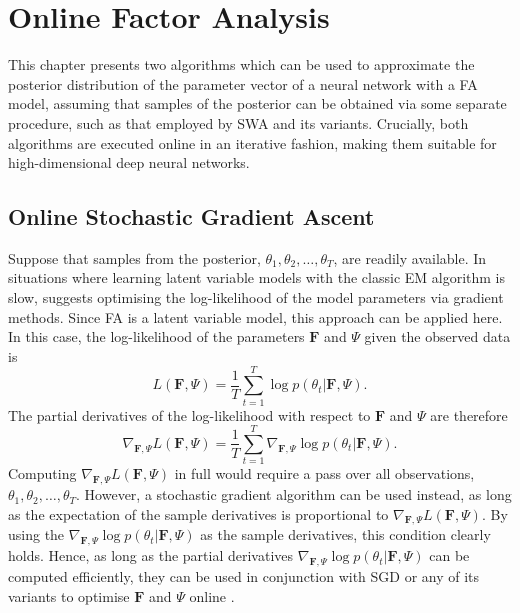 \documentclass[msc,deptreport.inf]{infthesis} %
\newcommand{\matr}[1]{\mathbf{#1}}
\begin{document}
\chapter{Online Factor Analysis}\label{ch:online_fa}

This chapter presents two algorithms which can be used to approximate the posterior distribution of the parameter vector of a neural network with a FA model, assuming that samples of the posterior can be obtained via some separate procedure, such as that employed by SWA and its variants. Crucially, both algorithms are executed online in an iterative fashion, making them suitable for high-dimensional deep neural networks.

\section{Online Stochastic Gradient Ascent}\label{sec:gradient_fa}

Suppose that samples from the posterior, $\theta_1, \theta_2, \dots,\theta_T$, are readily available. In situations where learning latent variable models with the classic EM algorithm is slow, \cite{barber2007} suggests optimising the log-likelihood of the model parameters via gradient methods. Since FA is a latent variable model, this approach can be applied here. In this case, the log-likelihood of the parameters $\matr{F}$ and $\Psi$ given the observed data is 
\begin{equation}
	L(\matr{F}, \Psi) = \frac{1}{T} \sum_{t=1}^T \log p(\theta_t | \matr{F}, \Psi).
\end{equation}
The partial derivatives of the log-likelihood with respect to $\matr{F}$ and $\Psi$ are therefore
\begin{equation}
	\nabla_{\matr{F}, \Psi} L(\matr{F}, \Psi) = \frac{1}{T} \sum_{t=1}^T \nabla_{\matr{F}, \Psi} \log p(\theta_t | \matr{F}, \Psi).
\end{equation}
Computing $\nabla_{\matr{F}, \Psi} L(\matr{F}, \Psi)$ in full would require a pass over all observations, $\theta_1, \theta_2, \dots, \theta_T$. However, a stochastic gradient algorithm can be used instead, as long as the expectation of the sample derivatives is proportional to $\nabla_{\matr{F}, \Psi} L(\matr{F}, \Psi)$. By using the $\nabla_{\matr{F}, \Psi} \log p(\theta_t | \matr{F}, \Psi)$ as the sample derivatives, this condition clearly holds. Hence, as long as the partial derivatives $\nabla_{\matr{F}, \Psi} \log p(\theta_t | \matr{F}, \Psi)$ can be computed efficiently, they can be used in conjunction with SGD or any of its variants to optimise $\matr{F}$ and $\Psi$ online \cite{brownlie2021}. 
\end{document}
